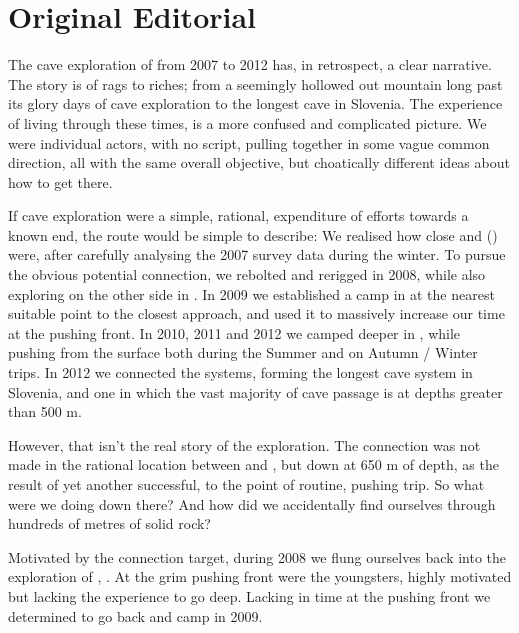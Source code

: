 \chapter*{Original Editorial}


The cave exploration of  from 2007 to 2012 has, in
retrospect, a clear narrative. 
The story is of rags to riches; from a
seemingly hollowed out mountain long past its glory days of cave exploration
to the longest cave in Slovenia. The experience of living through these
times, is a more confused and complicated picture. We were individual
actors, with no script, pulling together in some vague common
direction, all with the same overall objective, but choatically different
ideas about how to get there.

If cave exploration were a simple, rational, expenditure of efforts
towards a known end, the route would be simple to describe: We realised
how close  and  () were, after 
carefully analysing the 2007  survey data during the winter. To pursue
the obvious potential connection, we rebolted and rerigged 
in 2008, while also exploring on the other side in . In 2009 we established a camp in  at the nearest suitable point to the closest approach, and used it to massively increase our time at the pushing front. In 2010, 2011 and 2012 we camped deeper in ,
while pushing  from the surface both during the Summer and on
Autumn / Winter trips. In 2012 we connected the systems, forming the
longest cave system in Slovenia, and one in which the vast majority of
cave passage is at depths greater than 500 m.

However, that isn't the real story of the exploration. 
The connection was not
made in the rational location between  and , but down
at 650 m of depth, as the result of yet another successful, to the point
of routine, pushing trip. So what were we doing down there? And how did we accidentally find ourselves through hundreds of metres of solid rock?

Motivated by the connection target, during 2008 we flung ourselves back into the exploration of , . At the grim pushing front were the youngsters, highly motivated but lacking the experience to go deep. Lacking in time at the pushing front we determined to go back and camp in 2009. 


